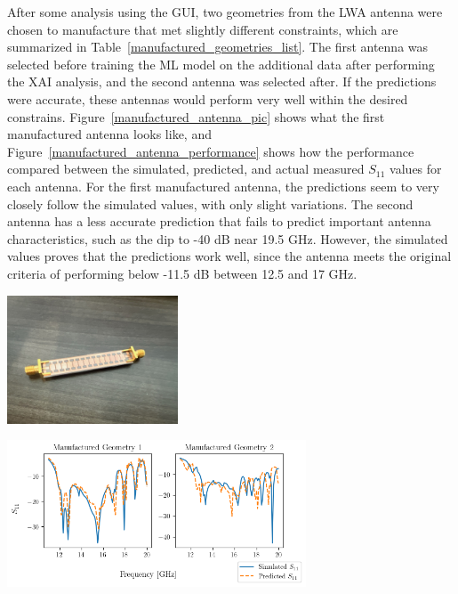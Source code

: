 \documentclass[conference]{IEEEtran}
\newenvironment{Figure}
    {\par\medskip\noindent\minipage{\linewidth}}
    {\endminipage\par\medskip}
\begin{document}
After some analysis using the GUI, two geometries from the LWA antenna were chosen to manufacture that met slightly different constraints, which are summarized in Table~\ref{manufactured_geometries_list}. The first antenna was selected before training the ML model on the additional data after performing the XAI analysis, and the second antenna was selected after. If the predictions were accurate, these antennas would perform very well within the desired constrains. Figure~\ref{manufactured_antenna_pic} shows what the first manufactured antenna looks like, and Figure~\ref{manufactured_antenna_performance} shows how the performance compared between the simulated, predicted, and actual measured $S_{11}$ values for each antenna. For the first manufactured antenna, the predictions seem to very closely follow the simulated values, with only slight variations. The second antenna has a less accurate prediction that fails to predict important antenna characteristics, such as the dip to -40 dB near 19.5 GHz. However, the simulated values proves that the predictions work well, since the antenna meets the original criteria of performing below -11.5 dB between 12.5 and 17 GHz.

\begin{Figure}
    \centering
    \includegraphics[width=2in]{manufactured_antenna}
    \label{manufactured_antenna_pic}
\end{Figure} 

\begin{Figure}
    \centering
    \includegraphics[width=3.5in]{manufactured_antenna_performance}
    \label{manufactured_antenna_performance}
\end{Figure} 
\end{document}
